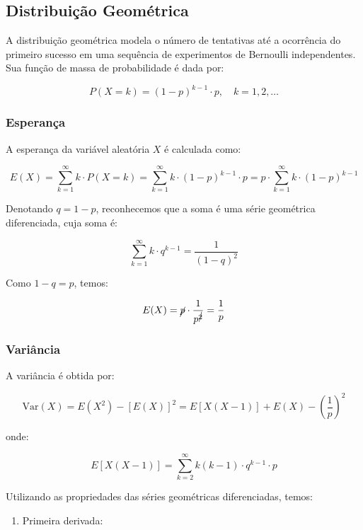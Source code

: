 \documentclass[
]{article}
\providecommand{\tightlist}{%
  \setlength{\itemsep}{0pt}\setlength{\parskip}{0pt}}
\begin{document}
\hypertarget{distribuiuxe7uxe3o-geomuxe9trica}{%
\subsection{Distribuição Geométrica}\label{distribuiuxe7uxe3o-geomuxe9trica}}

A distribuição geométrica modela o número de tentativas até a ocorrência do primeiro sucesso em uma sequência de experimentos de Bernoulli independentes. Sua função de massa de probabilidade é dada por:

\[
P(X = k) = (1 - p)^{k - 1} \cdot p, \quad k = 1, 2, \ldots
\]

\hypertarget{esperanuxe7a-4}{%
\subsubsection{Esperança}\label{esperanuxe7a-4}}

A esperança da variável aleatória \(X\) é calculada como:

\[
E(X) = \sum_{k=1}^{\infty} k \cdot P(X = k) = \sum_{k=1}^{\infty} k \cdot (1 - p)^{k - 1} \cdot p = p \cdot \sum_{k=1}^{\infty} k \cdot (1 - p)^{k-1}
\]

Denotando \(q = 1 - p\), reconhecemos que a soma é uma série geométrica diferenciada, cuja soma é:

\[
\sum_{k=1}^{\infty} k \cdot q^{k - 1} = \frac{1}{(1 - q)^2}
\]

Como \(1 - q = p\), temos:

\[
E(X) = \cancel{p} \cdot \frac{1}{p^{\cancel{2}}} = \frac{1}{p}
\]

\hypertarget{variuxe2ncia-4}{%
\subsubsection{Variância}\label{variuxe2ncia-4}}

A variância é obtida por:

\[
\text{Var}(X) = E(X^2) - [E(X)]^2 = E[X(X-1)] + E(X) - \left(\frac{1}{p}\right)^2
\]

onde:

\[
E[X(X-1)] = \sum_{k=2}^{\infty} k(k-1) \cdot q^{k - 1} \cdot p
\]

Utilizando as propriedades das séries geométricas diferenciadas, temos:

\begin{enumerate}
\def\labelenumi{\arabic{enumi}.}
\tightlist
\item
  Primeira derivada:
\end{enumerate}
\end{document}
